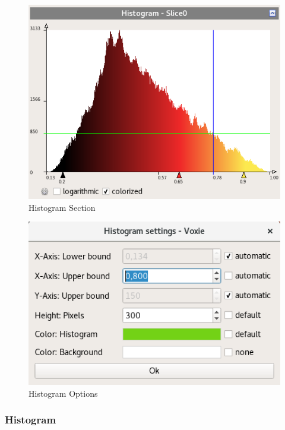 \begin{figure}[h!]
  \centering
  \includegraphics[scale=0.5]{img/2d/histogram}
  \caption{Histogram Section}
\end{figure}  

\begin{figure}[h!]
  \centering
  \includegraphics[scale=0.5]{img/2d/histosettings}
  \caption{Histogram Options}
\end{figure}  


\subsubsection{Histogram}

